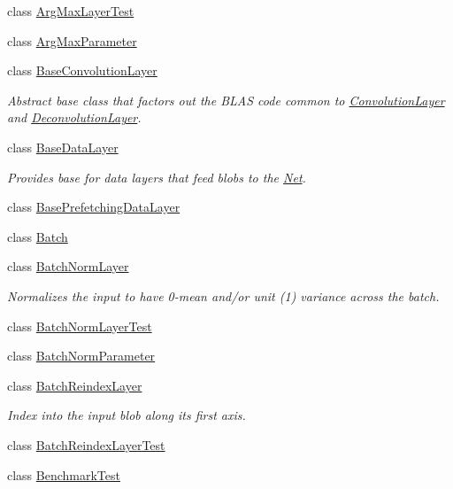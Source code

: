 \begin{DoxyCompactItemize}
class \mbox{\hyperlink{classcaffe_1_1_arg_max_layer_test}{Arg\+Max\+Layer\+Test}}
\item 
class \mbox{\hyperlink{classcaffe_1_1_arg_max_parameter}{Arg\+Max\+Parameter}}
\item 
class \mbox{\hyperlink{classcaffe_1_1_base_convolution_layer}{Base\+Convolution\+Layer}}
\begin{DoxyCompactList}\small\item\em Abstract base class that factors out the B\+L\+AS code common to \mbox{\hyperlink{classcaffe_1_1_convolution_layer}{Convolution\+Layer}} and \mbox{\hyperlink{classcaffe_1_1_deconvolution_layer}{Deconvolution\+Layer}}. \end{DoxyCompactList}\item 
class \mbox{\hyperlink{classcaffe_1_1_base_data_layer}{Base\+Data\+Layer}}
\begin{DoxyCompactList}\small\item\em Provides base for data layers that feed blobs to the \mbox{\hyperlink{classcaffe_1_1_net}{Net}}. \end{DoxyCompactList}\item 
class \mbox{\hyperlink{classcaffe_1_1_base_prefetching_data_layer}{Base\+Prefetching\+Data\+Layer}}
\item 
class \mbox{\hyperlink{classcaffe_1_1_batch}{Batch}}
\item 
class \mbox{\hyperlink{classcaffe_1_1_batch_norm_layer}{Batch\+Norm\+Layer}}
\begin{DoxyCompactList}\small\item\em Normalizes the input to have 0-\/mean and/or unit (1) variance across the batch. \end{DoxyCompactList}\item 
class \mbox{\hyperlink{classcaffe_1_1_batch_norm_layer_test}{Batch\+Norm\+Layer\+Test}}
\item 
class \mbox{\hyperlink{classcaffe_1_1_batch_norm_parameter}{Batch\+Norm\+Parameter}}
\item 
class \mbox{\hyperlink{classcaffe_1_1_batch_reindex_layer}{Batch\+Reindex\+Layer}}
\begin{DoxyCompactList}\small\item\em Index into the input blob along its first axis. \end{DoxyCompactList}\item 
class \mbox{\hyperlink{classcaffe_1_1_batch_reindex_layer_test}{Batch\+Reindex\+Layer\+Test}}
\item 
class \mbox{\hyperlink{classcaffe_1_1_benchmark_test}{Benchmark\+Test}}

\end{DoxyCompactItemize}

